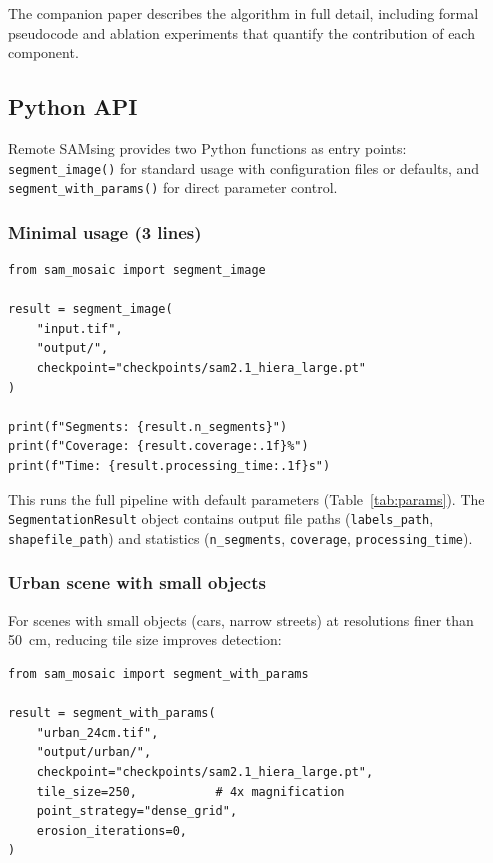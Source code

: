 \documentclass[review,11pt,authoryear]{elsarticle}
\begin{document}
\noindent
The companion paper \citep{carvalho2026jag} describes the algorithm in full detail, including formal pseudocode and ablation experiments that quantify the contribution of each component.


\subsection{Python API}
\label{sec:api}

Remote SAMsing provides two Python functions as entry points: \texttt{segment\_image()} for standard usage with configuration files or defaults, and \texttt{segment\_with\_params()} for direct parameter control.

\subsubsection{Minimal usage (3 lines)}

\begin{lstlisting}[style=python]
from sam_mosaic import segment_image

result = segment_image(
    "input.tif",
    "output/",
    checkpoint="checkpoints/sam2.1_hiera_large.pt"
)

print(f"Segments: {result.n_segments}")
print(f"Coverage: {result.coverage:.1f}%")
print(f"Time: {result.processing_time:.1f}s")
\end{lstlisting}

\noindent
This runs the full pipeline with default parameters (Table~\ref{tab:params}). The \texttt{SegmentationResult} object contains output file paths (\texttt{labels\_path}, \texttt{shapefile\_path}) and statistics (\texttt{n\_segments}, \texttt{coverage}, \texttt{processing\_time}).

\subsubsection{Urban scene with small objects}

For scenes with small objects (cars, narrow streets) at resolutions finer than 50~cm, reducing tile size improves detection:

\begin{lstlisting}[style=python]
from sam_mosaic import segment_with_params

result = segment_with_params(
    "urban_24cm.tif",
    "output/urban/",
    checkpoint="checkpoints/sam2.1_hiera_large.pt",
    tile_size=250,           # 4x magnification
    point_strategy="dense_grid",
    erosion_iterations=0,
)
\end{lstlisting}
\end{document}
